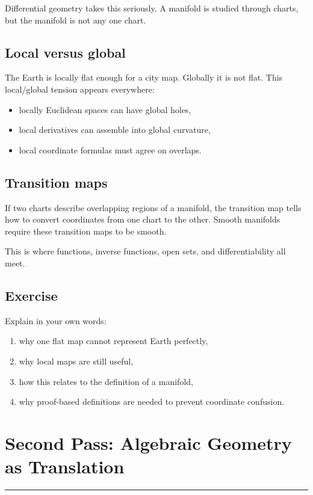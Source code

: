 \documentclass[12pt]{article}
\newcommand{\chapterline}{\vspace{0.4em}\hrule\vspace{0.8em}}
\begin{document}
Differential geometry takes this seriously. A manifold is studied through charts, but the manifold is not any one chart.

\subsection{Local versus global}

The Earth is locally flat enough for a city map. Globally it is not flat. This local/global tension appears everywhere:

\begin{itemize}
\item locally Euclidean spaces can have global holes,
\item local derivatives can assemble into global curvature,
\item local coordinate formulas must agree on overlaps.
\end{itemize}

\subsection{Transition maps}

If two charts describe overlapping regions of a manifold, the transition map tells how to convert coordinates from one chart to the other. Smooth manifolds require these transition maps to be smooth.

This is where functions, inverse functions, open sets, and differentiability all meet.

\subsection{Exercise}

Explain in your own words:

\begin{enumerate}
\item why one flat map cannot represent Earth perfectly,
\item why local maps are still useful,
\item how this relates to the definition of a manifold,
\item why proof-based definitions are needed to prevent coordinate confusion.
\end{enumerate}

\newpage
\section{Second Pass: Algebraic Geometry as Translation}
\chapterline
\end{document}
